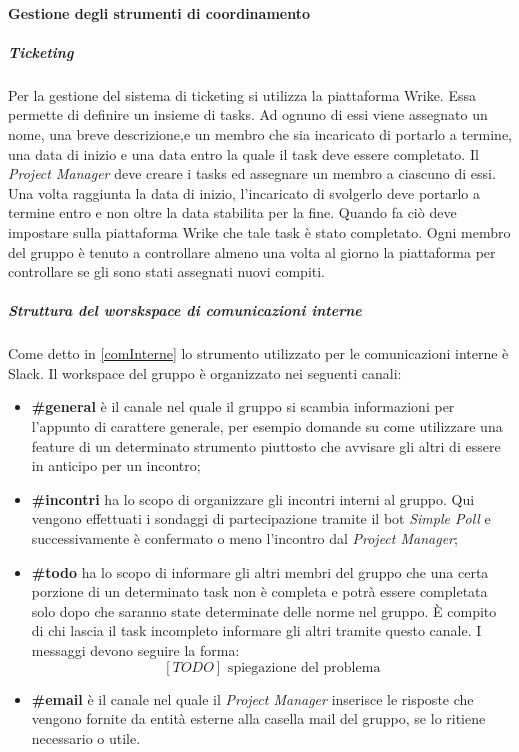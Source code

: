 		\paragraph{Gestione degli strumenti di coordinamento}
			\subparagraph{Ticketing} \Spazio
			Per la gestione del sistema di ticketing si utilizza la piattaforma Wrike. Essa permette di definire un insieme di tasks. Ad ognuno di essi viene assegnato un nome, una breve descrizione,e un membro che sia incaricato di portarlo a termine, una data di inizio e una data entro la quale il task deve essere completato. Il \emph{Project Manager} deve creare i tasks ed assegnare un membro a ciascuno di essi. Una volta raggiunta la data di inizio, l'incaricato di svolgerlo deve portarlo a termine entro e non oltre la data stabilita per la fine. Quando fa ciò deve impostare sulla piattaforma Wrike che tale task è stato completato. Ogni membro del gruppo è tenuto a controllare almeno una volta al giorno la piattaforma per controllare se gli sono stati assegnati nuovi compiti.
			
			\subparagraph{Struttura del worskspace di comunicazioni interne} \Spazio
			Come detto in \ref{comInterne} lo strumento utilizzato per le comunicazioni interne è Slack. Il workspace del gruppo è organizzato nei seguenti canali:
			\begin{itemize}
				\item \textbf{\#general} è il canale nel quale il gruppo si scambia informazioni per l'appunto di carattere generale, per esempio domande su come utilizzare una feature di un determinato strumento piuttosto che avvisare gli altri di essere in anticipo per un incontro;
				\item \textbf{\#incontri} ha lo scopo di organizzare gli incontri interni al gruppo. Qui vengono effettuati i sondaggi di partecipazione tramite il bot \emph{Simple Poll} e successivamente è confermato o meno l'incontro dal \emph{Project Manager};
				\item \textbf{\#todo} ha lo scopo di informare gli altri membri del gruppo che una certa porzione di un determinato task non è completa e potrà essere completata solo dopo che saranno state determinate delle norme nel gruppo. È compito di chi lascia il task incompleto informare gli altri tramite questo canale. I messaggi devono seguire la forma:
						$$[TODO]\text{ spiegazione del problema}$$
				\item \textbf{\#email} è il canale nel quale il \emph{Project Manager} inserisce le risposte che vengono fornite da entità esterne alla casella mail del gruppo, se lo ritiene necessario o utile.
			\end{itemize}
			

